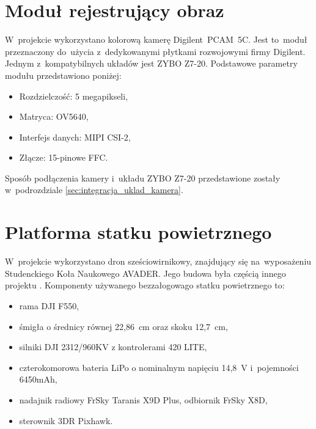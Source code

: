 \section{Moduł rejestrujący obraz}
\label{sec:pcam}

W~projekcie wykorzystano kolorową kamerę Digilent~PCAM~5C. 
Jest to~moduł przeznaczony do~użycia z~dedykowanymi płytkami rozwojowymi firmy Digilent. 
Jednym z~kompatybilnych układów jest ZYBO Z7-20. 
Podstawowe parametry modułu przedstawiono poniżej:
\begin{itemize}
	\item Rozdzielczość: 5 megapikseli,
	\item Matryca: OV5640,
	\item Interfejs danych: MIPI CSI-2,
	\item Złącze: 15-pinowe FFC.
\end{itemize}


Sposób podłączenia kamery i~układu ZYBO Z7-20 przedstawione zostały w~podrozdziale \ref{sec:integracja_uklad_kamera}.

\section{Platforma statku powietrznego}
\label{sec:platforma_statku_powietrznego}

W~projekcie wykorzystano dron sześciowirnikowy, znajdujący się na~wyposażeniu Studenckiego Koła Naukowego AVADER. 
Jego budowa była częścią innego projektu \cite{mgr}. 
Komponenty używanego bezzałogowago statku powietrznego to:
\begin{itemize}
	\item rama DJI F550,
	\item śmigła o średnicy równej 22,86~cm oraz skoku 12,7~cm,
	\item silniki DJI 2312/960KV z kontrolerami 420 LITE,
	\item czterokomorowa bateria LiPo o nominalnym napięciu 14,8~V i~pojemności 6450mAh, 
	\item nadajnik radiowy FrSky Taranis X9D Plus, odbiornik FrSky X8D,
	\item sterownik 3DR Pixhawk.
\end{itemize}

